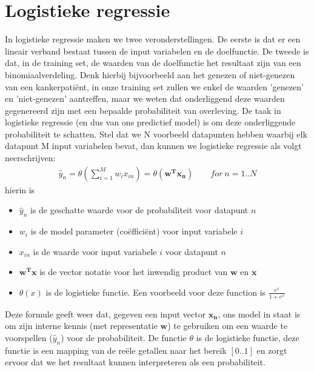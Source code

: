 \section{Logistieke regressie}
\label{subsec:D:pm-logistieke-regressie}
In logistieke regressie maken we twee veronderstellingen. De eerste is dat er een lineair verband bestaat tussen de input variabelen en de doelfunctie. De tweede is dat, in de training set, de waarden van de doelfunctie het resultaat zijn van een binomiaalverdeling. Denk hierbij bijvoorbeeld aan het genezen of niet-genezen van een kankerpati\"ent, in onze training set zullen we enkel de waarden 'genezen' en 'niet-genezen' aantreffen, maar we weten dat onderliggend deze waarden gegenereerd zijn met een bepaalde probabiliteit van overleving. De taak in logistieke regressie (en dus van ons predictief model) is om deze onderliggende probabiliteit te schatten. Stel dat we N voorbeeld datapunten hebben waarbij elk datapunt M input variabelen bevat, dan kunnen we logistieke regressie als volgt neerschrijven:
\begin{equation}
\begin{split}
\hat{y}_{n} = \theta(\sum_{i=1}^{M}w_{i}x_{in})= \theta(\bm{w^{T}x_{n}}) \qquad for\ n=1..N
\end{split}
\end{equation}
hierin is
\begin{itemize}
	\item $\hat{y}_{n}$ is de geschatte waarde voor de probabiliteit voor datapunt $n$
	\item $w_{i}$ is de model parameter (co\"effici\"ent) voor input variabele $i$
	\item $x_{in}$ is de waarde voor input variabele $i$ voor datapunt $n$
	\item $\bm{w^{T}x}$ is de vector notatie voor het inwendig product van $\bm{w}$ en $\bm{x}$
	\item $\theta(x)$ is de logistieke functie. Een voorbeeld voor deze function is $\frac{e^{x}}{1+e^{x}}$
\end{itemize}
Deze formule geeft weer dat, gegeven een input vector $\bm{x_{n}}$, ons model in staat is om zijn interne kennis (met representatie $\bm{w}$) te gebruiken om een waarde te voorspellen ($\hat{y}_{n}$) voor de probabiliteit. De functie $\theta$ is de logistieke functie, deze functie is een mapping van de re\"ele getallen naar het bereik $[0..1]$ en zorgt ervoor dat we het resultaat kunnen interpreteren als een probabiliteit.

